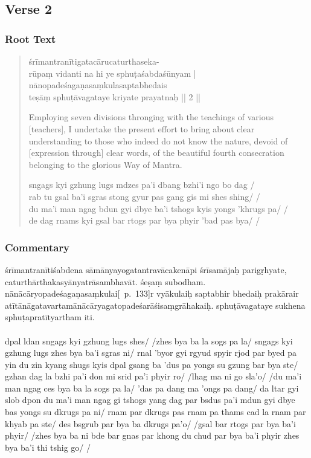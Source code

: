 \documentclass[12pt]{article}
\begin{document}
\subsection{Verse 2}
\subsubsection{Root Text}
\begin{quote}
	śrīmantranītigatacārucaturthaseka-\\
	rūpaṃ vidanti na hi ye sphuṭaśabdaśūnyam |\\
	nānopadeśagaṇasaṃkulasaptabhedais\\
	teṣāṃ sphuṭāvagataye kriyate prayatnaḥ || 2 ||

	Employing seven divisions thronging with the teachings of various [teachers], I undertake the present effort to bring about clear understanding to those who indeed do not know the nature, devoid of [expression through] clear words, of the beautiful fourth consecration belonging to the glorious Way of Mantra.

	sngags kyi gzhung lugs mdzes pa'i dbang bzhi'i ngo bo dag /\\
	rab tu gsal ba'i sgras stong gyur pas gang gis mi shes shing/ /\\
	du ma'i man ngag bdun gyi dbye ba'i tshogs kyis yongs 'khrugs pa/ /\\
	de dag rnams kyi gsal bar rtogs par bya phyir 'bad pas bya/ /
\end{quote}

\subsubsection{Commentary}
śrīmantranītiśabdena sāmānyayogatantravācakenāpi śrīsamājaḥ parigṛhyate, caturthārthakasyānyatrāsambhavāt.
śeṣaṃ subodham.
nānācāryopadeśagaṇasaṃkulai\hspace{0em}[\EDD\ p.\ 133]\hspace{0em}r vyākulaiḥ saptabhir bhedaiḥ prakārair atītānāgatavartamānācārya\footnoteB{
	°vartamānā°] \EDD ; °pravartamānā° \MS
}gatopadeśarāśisaṃgrāhakaiḥ.
sphuṭāvagataye sukhena sphuṭapratītyartham iti.\\

\textbf{\TVA}\\
dpal ldan sngags kyi gzhung lugs shes/ /zhes bya ba la sogs pa la/ sngags kyi gzhung lugs zhes bya ba'i sgras ni/ rnal 'byor gyi rgyud spyir rjod par byed pa yin du zin kyang shugs kyis dpal gsang ba 'dus pa yongs su gzung bar bya ste/ gzhan dag la bzhi pa'i don mi srid pa'i phyir ro/ /lhag ma ni go sla'o/ /du ma'i man ngag ces bya ba la sogs pa la/ 'das pa dang ma 'ongs pa dang/ da ltar gyi slob dpon du ma'i man ngag gi tshogs yang dag par bsdus pa'i mdun gyi dbye bas yongs su dkrugs pa ni/ rnam par dkrugs pas rnam pa thams cad la rnam par khyab pa ste/ des bsgrub par bya ba dkrugs pa'o/ /gsal bar rtogs par bya ba'i phyir/ /zhes bya ba ni bde bar gnas par khong du chud par bya ba'i phyir zhes bya ba'i thi tshig go/ /\\
\end{document}
